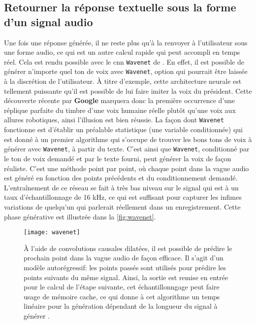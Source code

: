 \subsection{Retourner la réponse textuelle sous la forme d'un signal audio}
Une fois une réponse générée, il ne reste plus qu'à la renvoyer à l'utilisateur sous une forme audio, ce qui est un autre calcul rapide qui peut accompli en temps réel. Cela est rendu possible avec le \gls{cnn} \texttt{Wavenet} de \cite{wavenet}. En effet, il est possible de générer n’importe quel ton de voix avec \texttt{Wavenet}, option qui pourrait être laissée à la discrétion de l’utilisateur. À titre d’exemple, cette architecture neurale est tellement puissante qu’il est possible de lui faire imiter la voix du président. Cette découverte récente par \textbf{Google} marquera donc la première occurrence d'une réplique parfaite du timbre d'une voix humaine réelle plutôt qu’une voix aux allures robotiques, ainsi l’illusion est bien réussie. La façon dont \texttt{Wavenet} fonctionne est d’établir un préalable statistique (une variable conditionnée) qui est donné à un premier algorithme qui s’occupe de trouver les bons tons de voix à générer avec \texttt{Wavenet}, à partir du texte. C’est ainsi que \texttt{Wavenet}, conditionné par le ton de voix demandé et par le texte fourni, peut générer la voix de façon réaliste. C’est une méthode point par point, où chaque point dans la vague audio est généré en fonction des points précédents et du conditionnement demandé. L'entraînement de ce réseau se fait à très bas niveau sur le signal qui est à un taux d’échantillonnage de 16 kHz, ce qui est suffisant pour capturer les infimes variations de quelqu’un qui parlerait réellement dans un enregistrement. Cette phase générative est illustrée dans la \autoref{fig:wavenet}.

\begin{figure*}
  \centering
  \texttt{[image: wavenet]}
  \caption{À l’aide de convolutions causales dilatées, il est possible de prédire le prochain point dans la vague audio de façon efficace. Il s'agit d'un modèle autorégressif: les points passés sont utilisés pour prédire les points suivants du même signal. Ainsi, la sortie est remise en entrée pour le calcul de l’étape suivante, cet échantillonngage peut faire usage de mémoire cache, ce qui donne à cet algorithme un temps linéaire pour la génération dépendant de la longueur du signal à générer \cite{wavenet}.}
  \label{fig:wavenet}
\end{figure*}
